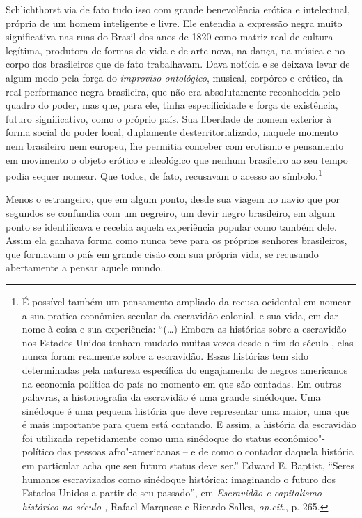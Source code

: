 Schlichthorst via de fato tudo isso com grande benevolência erótica e
intelectual, própria de um homem inteligente e livre. Ele entendia a
expressão negra muito significativa nas ruas do Brasil dos anos de 1820
como matriz real de cultura legítima, produtora de formas de vida e de
arte nova, na dança, na música e no corpo dos brasileiros que de fato
trabalhavam. Dava notícia e se deixava levar de algum modo pela força do
\emph{improviso ontológico}, musical, corpóreo e erótico, da real
performance negra brasileira, que não era absolutamente reconhecida pelo
quadro do poder, mas que, para ele, tinha especificidade e força de
existência, futuro significativo, como o próprio país. Sua liberdade de
homem exterior à forma social do poder local, duplamente
desterritorializado, naquele momento nem brasileiro nem europeu, lhe
permitia conceber com erotismo e pensamento em movimento o objeto
erótico e ideológico que nenhum brasileiro ao seu tempo podia sequer
nomear. Que todos, de fato, recusavam o acesso ao símbolo.\footnote{É
  possível também um pensamento ampliado da recusa ocidental em nomear a
  sua pratica econômica secular da escravidão colonial, e sua vida, em
  dar nome à coisa e sua experiência: ``(\ldots{}) Embora as histórias sobre
  a escravidão nos Estados Unidos tenham mudado muitas vezes desde o fim
  do século , elas nunca foram realmente sobre a escravidão. Essas
  histórias tem sido determinadas pela natureza específica do
  engajamento de negros americanos na economia política do país no
  momento em que são contadas. Em outras palavras, a historiografia da
  escravidão é uma grande sinédoque. Uma sinédoque é uma pequena
  história que deve representar uma maior, uma que é mais importante
  para quem está contando. E assim, a história da escravidão foi
  utilizada repetidamente como uma sinédoque do status
  econômico"-político das pessoas afro"-americanas -- e de como o contador
  daquela história em particular acha que seu futuro status deve ser.''
  Edward E. Baptist, ``Seres humanos escravizados como sinédoque
  histórica: imaginando o futuro dos Estados Unidos a partir de seu
  passado'', em \emph{Escravidão e capitalismo histórico no século ,}
  Rafael Marquese e Ricardo Salles, \emph{op.cit.}, p. 265.}

Menos o estrangeiro, que em algum ponto, desde sua viagem no navio que
por segundos se confundia com um negreiro, um devir negro brasileiro, em
algum ponto se identificava e recebia aquela experiência popular como
também dele. Assim ela ganhava forma como nunca teve para os próprios
senhores brasileiros, que formavam o país em grande cisão com sua
própria vida, se recusando abertamente a pensar aquele mundo.

